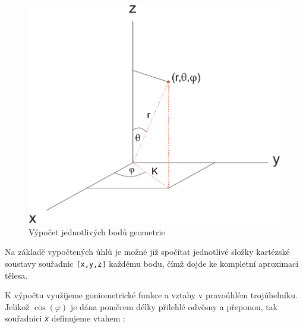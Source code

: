 \begin{figure}[h]
	\label{img:2}
	\centering
	\includegraphics[scale=1.0,angle=0,width=0.6\linewidth]{obrazky-figures/geometry}
	\caption{Výpočet jednotlivých bodů geometrie}
	\label{fig:geom}
\end{figure}
 
Na základě vypočtených úhlů je možné již spočítat jednotlivé složky kartézské soustavy souřadnic \texttt{[x,y,z]} každému bodu, čímž dojde ke kompletní aproximaci tělesa.

\newpage

K výpočtu využijeme goniometrické funkce  a vztahy v pravoúhlém trojúhelníku. Jelikož $ \cos (\varphi) $ je dána poměrem délky přilehlé odvěsny a přeponou, tak souřadnici \texttt{\textit{x}} definujeme vtahem \cite{Goniometrie}:
 
